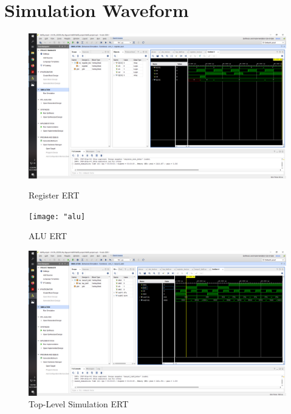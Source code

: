 \documentclass[11pt]{article}
\begin{document}
\section*{Simulation Waveform}
\begin{figure}[ht]
	\centering
	\includegraphics[width=\textwidth,trim=24cm 19cm 0.5cm 5.5cm,clip]{"regit"}
	\caption{Register ERT}
	\texttt{[image: "alu]}
	\caption{ALU ERT}
	\includegraphics[width=\textwidth,trim=22cm 18.5cm 0.5cm 5.5cm,clip]{"sim"}
	\caption{Top-Level Simulation ERT}
\end{figure}
\end{document}
